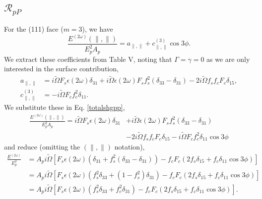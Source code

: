 \documentclass[10pt]{article}
\begin{document}
\subsection{\texorpdfstring{$\mathcal{R}_{pP}$}{RpP}}

For the (111) face ($m = 3$), we have 
\begin{equation}\label{totalshgpp} %
\frac{E^{(2\omega)}(\parallel,\parallel)}{E^{2}_{p}A_{p}}
= a_{\parallel,\parallel} + c^{(3)}_{\parallel,\parallel}\cos3\phi.
\end{equation}
We extract these coefficients from Table V, noting that $\Gamma = \gamma = 0$
as we are only interested in the surface contribution,
\begin{align*}
a_{\parallel,\parallel}
&= i\tilde{\Omega}F_{s}\epsilon(2\omega)\delta_{31}
 + i\tilde{\Omega}\epsilon(2\omega)F_{s}f^{2}_{s}(\delta_{33} - \delta_{31})
 - 2i\tilde{\Omega}f_{s}f_{c}F_{c}\delta_{15},\\
c^{(3)}_{\parallel,\parallel} &= -i\tilde{\Omega}F_{c}f^{2}_{c}\delta_{11}.
\end{align*}
We substitute these in Eq. \eqref{totalshgpp},
\begin{equation*}
\begin{split}
\frac{E^{(2\omega)}(\parallel,\parallel)}{E^{2}_{p}A_{p}}
 = i\tilde{\Omega}F_{s}\epsilon(2\omega)\delta_{31} 
&+ i\tilde{\Omega}\epsilon(2\omega)F_{s}f^{2}_{s}(\delta_{33} - \delta_{31})\\ 
&- 2i\tilde{\Omega}f_{s}f_{c}F_{c}\delta_{15}
 - i\tilde{\Omega}F_{c}f^{2}_{c}\delta_{11}\cos3\phi
\end{split}
\end{equation*}
and reduce (omitting the $(\parallel,\parallel)$ notation),
\begin{equation*}
\begin{split}
\frac{E^{(2\omega)}}{E^{2}_{p}}
&= A_{p}i\tilde{\Omega}
   \left[
   F_{s}\epsilon(2\omega)(\delta_{31} + f^{2}_{s}(\delta_{33} - \delta_{31}))
    - f_{c}F_{c}(2f_{s}\delta_{15} + f_{c}\delta_{11}\cos3\phi)
   \right]\\
&= A_{p}i\tilde{\Omega}
   \left[
   F_{s}\epsilon(2\omega)(f^{2}_{s}\delta_{33} + (1 - f^{2}_{s})\delta_{31})
   - f_{c}F_{c}(2f_{s}\delta_{15} + f_{c}\delta_{11}\cos3\phi)
   \right]\\
&= A_{p}i\tilde{\Omega}
   \left[
   F_{s}\epsilon(2\omega)(f^{2}_{s}\delta_{33} + f^{2}_{c}\delta_{31}) 
   - f_{c}F_{c}(2f_{s}\delta_{15} + f_{c}\delta_{11}\cos3\phi)
   \right].
\end{split}
\end{equation*}
\end{document}
